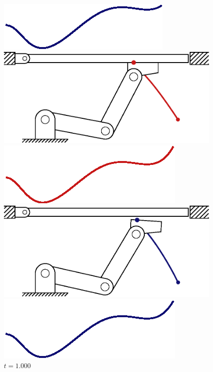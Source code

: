 \documentclass[../DC2019003Bouma.tex]{subfiles}
\begin{document}
\begin{figure}[bt!]
\begin{minipage}[c]{.3\textwidth}
\vspace{0.05cm}
	\begin{flushleft}
    \includegraphics[scale=0.55]{tracking/trcsnap_t93.eps}
	\end{flushleft}
	\caption*{$t=0.933$}
\end{minipage}
\begin{minipage}[c]{.3\textwidth}
\centering
    \includegraphics[width=\textwidth]{reference/frame31.eps}
	\begin{flushleft}
    \includegraphics[scale=0.55]{reference/refsnap_t100.eps}
	\end{flushleft}
    \includegraphics[width=\textwidth]{tracking/frame31.eps}
	\begin{flushleft}
    \includegraphics[scale=0.55]{tracking/trcsnap_t100.eps}
	\end{flushleft}
	\caption*{$t=1.000$}
\end{minipage}


\end{figure}
\end{document}
